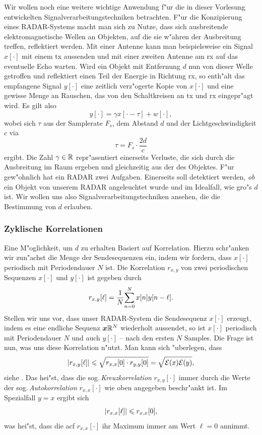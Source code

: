 Wir wollen noch eine weitere wichtige Anwendung f"ur die in dieser Vorlesung entwickelten Signalverarbeitungstechniken betrachten.
F"ur die Konzipierung eines RADAR-Systems macht man sich zu Nutze, dass sich ausbreitende elektromagnetische Wellen an Objekten, auf die sie w"ahren der Ausbreitung treffen, reflektiert werden.
Mit einer Antenne kann man beispielsweise ein Signal $x[\cdot]$ mit einem \gls{tx} aussenden und mit einer zweiten Antenne am \gls{rx} auf das eventuelle Echo warten.
Wird ein Objekt mit Entfernung $d$ nun von dieser Welle getroffen und reflektiert einen Teil der Energie in Richtung \gls{rx}, so enth"alt das empfangene Signal $y[\cdot]$ eine zeitlich verz"ogerte Kopie von $x[\cdot]$ und eine gewisse Menge an Rauschen, das von den Schaltkreisen an \gls{tx} und \gls{rx} eingepr"agt wird.
Es gilt also
\[
y[\cdot] = \gamma x[\cdot - \tau] + w[\cdot],
\]
wobei sich $\tau$ aus der Samplerate $F_s$, dem Abstand $d$ und der Lichtgeschwindigkeit $c$ via
\[
\tau = F_s \cdot \frac{2d}{c} 
\]
ergibt.
Die Zahl $\gamma \in \mathbb{R}$ repr"asentiert einerseits Verluste, die sich durch die Ausbreitung im Raum ergeben und gleichzeitig aus der  des Objektes.
F"ur gew"ohnlich hat ein RADAR zwei Aufgaben. 
Einerseits soll detektiert werden, \emph{ob} ein Objekt von unserem RADAR angeleuchtet wurde und im Idealfall, wie gro"s $d$ ist.
Wir wollen uns also Signalverarbeitungstechniken ansehen, die die Bestimmung von $d$ erlauben.
%
\subsubsection{Zyklische Korrelationen}
%
Eine M"oglichkeit, um $d$ zu erhalten Basiert auf Korrelation.
Hierzu schr"anken wir zun"achst die Menge der Sendesequenzen ein, indem wir fordern, dass $x[\cdot]$ periodisch mit Periodendauer $N$ ist.
Die Korrelation $r_{x,y}$ von zwei periodischen Sequenzen $x[\cdot]$ und $y[\cdot]$ ist gegeben durch
\begin{equation}\label{eq:mseq:corr}
    r_{x,y}[\ell] = \frac{1}{N}{\sum\limits_{n = 0}^{N}{
        x[n]y[n - \ell]
    }}.
\end{equation}
Stellen wir uns vor, dass unser RADAR-System die Sendesequenz $x[\cdot]$ erzeugt, indem es eine endliche Sequenz $\bm x \mathbb{R}^{N}$ wiederholt aussendet, so ist $x[\cdot]$ periodisch mit Periodendauer $N$ und auch $y[\cdot]$ -- nach den ersten $N$ Samples.
Die Frage ist nun, was uns diese Korrelation n"utzt.
Man kann sich "uberlegen, dass
\[
{\left| r_{x,y}[\ell] \right|} 
    \leqslant \sqrt{
        r_{x,x}[0] \cdot r_{y,y}[0] 
    }
    = \sqrt{
        \mathcal{E}(x) \mathcal{E}(y)
    },
\]
siehe .
Das hei"st, dass die sog.\,\emph{Kreuzkorrelation} $r_{x,y}[\cdot]$ immer durch die Werte der sog.\,\emph{Autokorrelation} $r_{x,x}[\cdot]$ wie oben angegeben beschr"ankt ist.
Im Spezialfall $y=x$ ergibt sich
\[
{\left| r_{x,x}[\ell] \right|} \leqslant r_{x,x}[0],
\]
was hei"st, dass die \gls{acf} $r_{x,x}[\cdot]$ ihr Maximum immer am Wert $\ell=0$ annimmt.

